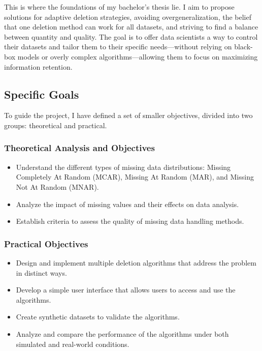\documentclass[a4paper,12pt]{article}
\begin{document}
This is where the foundations of my bachelor's thesis lie. I aim to propose solutions for adaptive deletion strategies, avoiding overgeneralization, the belief that one deletion method can work for all datasets, and striving to find a balance between quantity and quality. The goal is to offer data scientists a way to control their datasets and tailor them to their specific needs—without relying on black-box models or overly complex algorithms—allowing them to focus on maximizing information retention.\\

\subsection{Specific Goals}
To guide the project, I have defined a set of smaller objectives, divided into two groups: theoretical and practical.

\subsubsection{Theoretical Analysis and Objectives}
\begin{itemize}
    \item Understand the different types of missing data distributions: Missing Completely At Random (MCAR), Missing At Random (MAR), and Missing Not At Random (MNAR).
    \item Analyze the impact of missing values and their effects on data analysis.
    \item Establish criteria to assess the quality of missing data handling methods.
\end{itemize}

\subsubsection{Practical Objectives}
\begin{itemize}
    \item Design and implement multiple deletion algorithms that address the problem in distinct ways.
    \item Develop a simple user interface that allows users to access and use the algorithms.
    \item Create synthetic datasets to validate the algorithms.
    \item Analyze and compare the performance of the algorithms under both simulated and real-world conditions.
\end{itemize}
\end{document}
